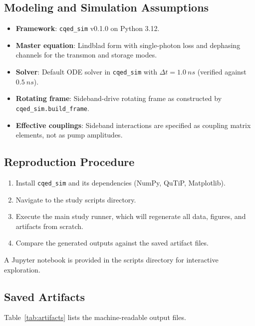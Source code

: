 \documentclass[aps,pra,twocolumn,reprint,floatfix,amsmath,amssymb]{revtex4-2}
\begin{document}
\subsection{Modeling and Simulation Assumptions}
\begin{itemize}
\item \textbf{Framework}: \texttt{cqed\_sim} v0.1.0 on Python 3.12.
\item \textbf{Master equation}: Lindblad form with single-photon loss and dephasing channels for the transmon and storage modes.
\item \textbf{Solver}: Default ODE solver in \texttt{cqed\_sim} with $\Delta t = \SI{1.0}{ns}$ (verified against $\SI{0.5}{ns}$).
\item \textbf{Rotating frame}: Sideband-drive rotating frame as constructed by \texttt{cqed\_sim.build\_frame}.
\item \textbf{Effective couplings}: Sideband interactions are specified as coupling matrix elements, not as pump amplitudes.
\end{itemize}

\subsection{Reproduction Procedure}
\begin{enumerate}
\item Install \texttt{cqed\_sim} and its dependencies (NumPy, QuTiP, Matplotlib).
\item Navigate to the study scripts directory.
\item Execute the main study runner, which will regenerate all data, figures, and artifacts from scratch.
\item Compare the generated outputs against the saved artifact files.
\end{enumerate}
A Jupyter notebook is provided in the scripts directory for interactive exploration.

\subsection{Saved Artifacts}
\label{app:artifacts}

Table~\ref{tab:artifacts} lists the machine-readable output files.
\end{document}
